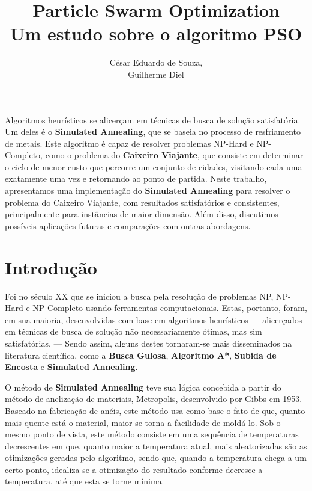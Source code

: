 \documentclass[12pt]{article}
\title{Particle Swarm Optimization\\ Um estudo sobre o algoritmo PSO}
\author{César Eduardo de Souza\inst{1},\\ Guilherme Diel\inst{1}}
\begin{document}
 

\maketitle

     
\begin{resumo} 
  Algoritmos heurísticos se alicerçam em técnicas de busca de solução satisfatória. Um deles é o \textbf{Simulated Annealing}, que se baseia no processo de resfriamento de metais. Este algoritmo é capaz de resolver problemas NP-Hard e NP-Completo, como o problema do \textbf{Caixeiro Viajante}, que consiste em determinar o ciclo de menor custo que percorre um conjunto de cidades, visitando cada uma exatamente uma vez e retornando ao ponto de partida. Neste trabalho, apresentamos uma implementação do \textbf{Simulated Annealing} para resolver o problema do Caixeiro Viajante, com resultados satisfatórios e consistentes, principalmente para instâncias de maior dimensão. Além disso, discutimos possíveis aplicações futuras e comparações com outras abordagens.
\end{resumo}


\section{Introdução}
\label{sec:introducao}
Foi no século XX que se iniciou a busca pela resolução de problemas NP, NP-Hard e NP-Completo usando ferramentas computacionais. 
%
Estas, portanto, foram, em sua maioria, desenvolvidas com base em algoritmos heurísticos — alicerçados em técnicas de busca de solução não necessariamente ótimas, mas sim satisfatórias. — 
%
Sendo assim, alguns destes tornaram-se mais disseminados na literatura científica, como a \textbf{Busca Gulosa}, \textbf{Algoritmo A*}, \textbf{Subida de Encosta} e \textbf{Simulated Annealing}.

O método de \textbf{Simulated Annealing} teve sua lógica concebida a partir do método de anelização de materiais, Metropolis, desenvolvido por Gibbs em 1953.
%
Baseado na fabricação de anéis, este método usa como base o fato de que, quanto mais quente está o material, maior se torna a facilidade de moldá-lo.%
Sob o mesmo ponto de vista, este método consiste em uma sequência de temperaturas decrescentes em que, quanto maior a temperatura atual, mais aleatorizadas são as otimizações geradas pelo algoritmo, sendo que, quando a temperatura chega a um certo ponto, idealiza-se a otimização do resultado conforme decresce a temperatura, até que esta se torne mínima.
\end{document}
